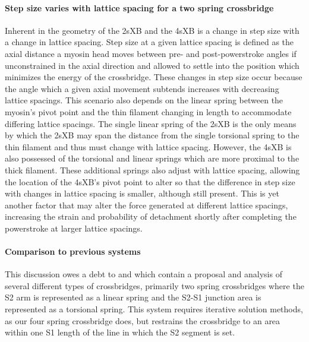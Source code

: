 \documentclass[]{article}
\begin{document}
\paragraph{Step size varies with lattice spacing for a two spring crossbridge} %
Inherent in the geometry of the 2sXB and the 4sXB is a change in step size with a change in lattice spacing.
Step size at a given lattice spacing is defined as the axial distance a myosin head moves between pre- and post-powerstroke angles if unconstrained in the axial direction and allowed to settle into the position which minimizes the energy of the crossbridge.
These changes in step size occur because the angle which a given axial movement subtends increases with decreasing lattice spacings.
This scenario also depends on the linear spring between the myosin's pivot point and the thin filament changing in length to accommodate differing lattice spacings.
The single linear spring of the 2sXB is the only means by which the 2sXB may span the distance from the single torsional spring to the thin filament and thus must change with lattice spacing.
However, the 4sXB is also possessed of the torsional and linear springs which are more proximal to the thick filament.
These additional springs also adjust with lattice spacing, allowing the location of the 4sXB's pivot point to alter so that the difference in step size with changes in lattice spacing is smaller, although still present.
This is yet another factor that may alter the force generated at different lattice spacings, increasing the strain and probability of detachment shortly after completing the powerstroke at larger lattice spacings.


\paragraph{Comparison to previous systems} %
This discussion owes a debt to \citet{Schoenberg:1980:p1802} and \citet{Schoenberg:1980:p1627} which contain a proposal and analysis of several different types of crossbridges, primarily two spring crossbridges where the S2 arm is represented as a linear spring and the S2-S1 junction area is represented as a torsional spring. 
This system requires iterative solution methods, as our four spring crossbridge does, but restrains the crossbridge to an area within one S1 length of the line in which the S2 segment is set.
\end{document}
